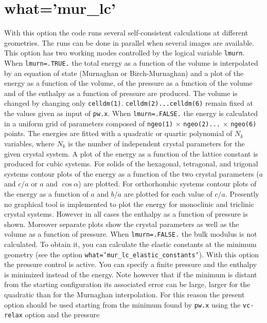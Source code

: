 \documentclass[12pt,a4paper,twoside]{report}
\begin{document}
\newpage
{\color{coral}\section{what='mur\_lc'}}
\color{black}
With this option the code runs several self-consistent calculations
at different geometries. The runs can be done in parallel when several images 
are available. This option has two working modes controlled by the 
logical variable \texttt{lmurn}. When \texttt{lmurn=.TRUE.} the total energy as 
a function of the volume is interpolated by an equation of state
(Murnaghan or Birch-Murnaghan) and 
a plot of the energy as a function of the volume, of the pressure 
as a function of the volume and of the enthalpy as a function of
pressure are produced. The volume is changed by 
changing only \texttt{celldm(1)}. \texttt{celldm(2)...celldm(6)} remain fixed
at the values given as input of \texttt{pw.x}. 
When \texttt{lmurn=.FALSE.} the energy is calculated in a uniform
grid of parameters composed of \texttt{ngeo(1)} $\times$ \texttt{ngeo(2)...}
$\times$ \texttt{ngeo(6)} points.
The energies are fitted with a quadratic or quartic polynomial of
$N_k$ variables, where $N_k$ is the number of independent crystal
parameters for the given crystal system. A plot of the energy as 
a function of the lattice constant is produced for cubic systems.
For solids of the hexagonal, tetragonal, and trigonal systems
contour plots of the energy as a function of the two crystal parameters
($a$ and $c/a$ or $a$ and $\cos\alpha$)
are plotted. For orthorhombic systems contour plots of the energy as a function
of $a$ and $b/a$ are plotted for each value of $c/a$. 
Presently no graphical tool is implemented to plot the energy
for monoclinic and triclinic crystal systems. However in all cases
the enthalpy as a function of pressure is shown. Moreover
separate plots show the crystal parameters as well as the volume as 
a function of pressure.
When \texttt{lmurn=.FALSE.} the bulk modulus
is not calculated. To obtain it, you can calculate the elastic constants at the
minimum geometry (see the option \texttt{what='mur\_lc\_elastic\_constants'}). 
With this option the pressure control is active. You can specify a 
finite pressure and the enthalpy is minimized instead of the
energy. Note however that if the minimum is distant from the starting
configuration its associated error can be large, larger for the
quadratic than for the Murnaghan interpolation. For this
reason the present option should be used starting from the minimum found by
\texttt{pw.x} using the \texttt{vc-relax} option and the pressure 
\end{document}
